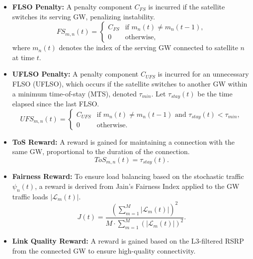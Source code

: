\begin{itemize}
    \item \textbf{FLSO Penalty:} A penalty component $C_{FS}$ is incurred if the satellite switches its serving GW, penalizing instability.
    \begin{equation}
    FS_{m,n}(t) = \begin{cases} C_{FS} & \text{if } m_n(t) \neq m_{n}(t-1), \\ 0 & \text{otherwise}, \end{cases}
    \label{eq:flso_cost}
    \end{equation}
    where $m_n(t)$ denotes the index of the serving GW connected to satellite $n$ at time $t$.

    \item \textbf{UFLSO Penalty:} A penalty component $C_{UFS}$ is incurred for an unnecessary FLSO (UFLSO), which occurs if the satellite switches to another GW within a minimum time-of-stay (MTS), denoted $\tau_{min}$. Let $\tau_{stay}(t)$ be the time elapsed since the last FLSO.
    \begin{equation}
    UFS_{m,n}(t) = \begin{cases} C_{UFS} & \text{if } m_n(t) \neq m_{n}(t-1) \text{ and } \tau_{stay}(t) < \tau_{min}, \\ 0 & \text{otherwise}. \end{cases}
    \label{eq:uflso_cost}
    \end{equation}
    
    \item \textbf{ToS Reward:} A reward is gained for maintaining a connection with the same GW, proportional to the duration of the connection.
    \begin{equation}
    ToS_{m,n}(t) = \tau_{stay}(t).
    \label{eq:tos_reward}
    \end{equation}

    \item \textbf{Fairness Reward:} To ensure load balancing based on the stochastic traffic $\psi_n(t)$, a reward is derived from Jain's Fairness Index \cite{jain1984quantitative} applied to the GW traffic loads $|\mathcal{L}_m(t)|$.
    \begin{equation}
    J(t) = \frac{(\sum_{m=1}^{M} |\mathcal{L}_m(t)|)^2}{M \cdot \sum_{m=1}^{M} (|\mathcal{L}_m(t)|)^2}.
    \label{eq:jain_index_term}
    \end{equation}
    
    \item \textbf{Link Quality Reward:} A reward is gained based on the L3-filtered RSRP from the connected GW to ensure high-quality connectivity.

\end{itemize}

